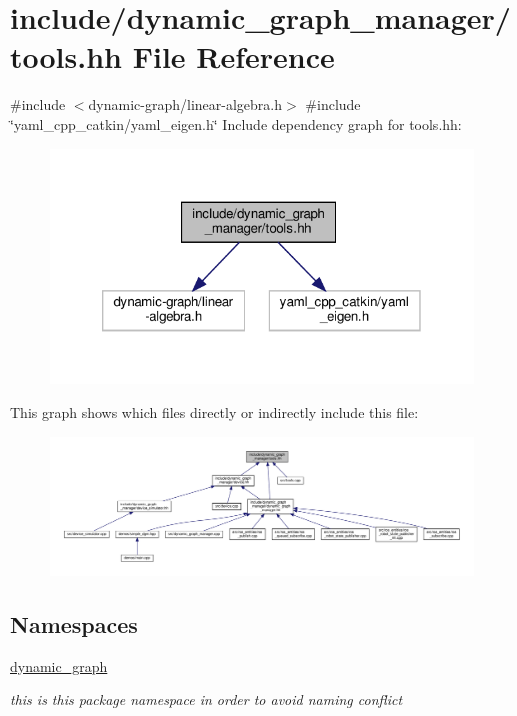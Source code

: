 \hypertarget{tools_8hh}{}\section{include/dynamic\+\_\+graph\+\_\+manager/tools.hh File Reference}
\label{tools_8hh}
{\ttfamily \#include $<$dynamic-\/graph/linear-\/algebra.\+h$>$}\newline
{\ttfamily \#include \char`\"{}yaml\+\_\+cpp\+\_\+catkin/yaml\+\_\+eigen.\+h\char`\"{}}\newline
Include dependency graph for tools.\+hh\+:
\nopagebreak
\begin{figure}[H]
\begin{center}
\leavevmode
\includegraphics[width=320pt]{tools_8hh__incl}
\end{center}
\end{figure}
This graph shows which files directly or indirectly include this file\+:
\nopagebreak
\begin{figure}[H]
\begin{center}
\leavevmode
\includegraphics[width=350pt]{tools_8hh__dep__incl}
\end{center}
\end{figure}
\subsection*{Namespaces}
\begin{DoxyCompactItemize}
\item 
 \hyperlink{namespacedynamic__graph}{dynamic\+\_\+graph}
\begin{DoxyCompactList}\small\item\em this is this package namespace in order to avoid naming conflict \end{DoxyCompactList}\end{DoxyCompactItemize}
